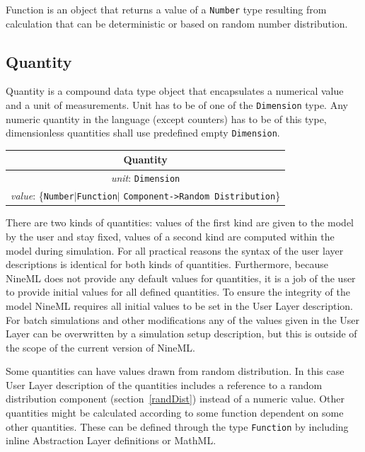 \documentclass{article}
\begin{document}
Function is an object that returns a value of a {\tt Number} type resulting
from calculation that can be deterministic or based on random number
distribution.

\subsection{Quantity}

Quantity is a compound data type object that encapsulates a numerical value
and a unit of measurements. Unit has to be of one of the {\tt Dimension} type.
Any numeric quantity in the language (except counters) has to be of this type,
dimensionless quantities shall use predefined empty {\tt Dimension}.

\begin{table}[htb]
\center
\begin{tabular}{|c|}
\hline
\hline
Quantity \\
\hline
\hline
{\em unit}: {\tt Dimension} \\
\hline
{\em value}: \{{\tt Number}$|${\tt Function}$|$%
{\tt Component->Random Distribution}\} \\
\hline
\end{tabular}
\end{table}

There are two kinds of quantities: values of the first kind are given to the
model by the user and stay fixed, values of a second kind are computed within
the model during simulation. For all practical reasons the syntax of the user
layer descriptions is identical for both kinds of quantities. Furthermore,
because NineML does not provide any default values for quantities, it is a
job of the user to provide initial values for all defined quantities. To
ensure the integrity of the model NineML requires all initial values to be
set in the User Layer description. For batch simulations and other
modifications any of the values given in the User Layer can be overwritten
by a simulation setup description, but this is outside of the scope of the
current version of NineML.

Some quantities can have values drawn from random distribution. In this case
User Layer description of the quantities includes a reference to a random
distribution component (section~\ref{randDist}) instead of a numeric value.
Other quantities might be calculated according to some function dependent on
some other quantities. These can be defined through the type {\tt Function} by
including inline Abstraction Layer definitions or MathML.
\end{document}
